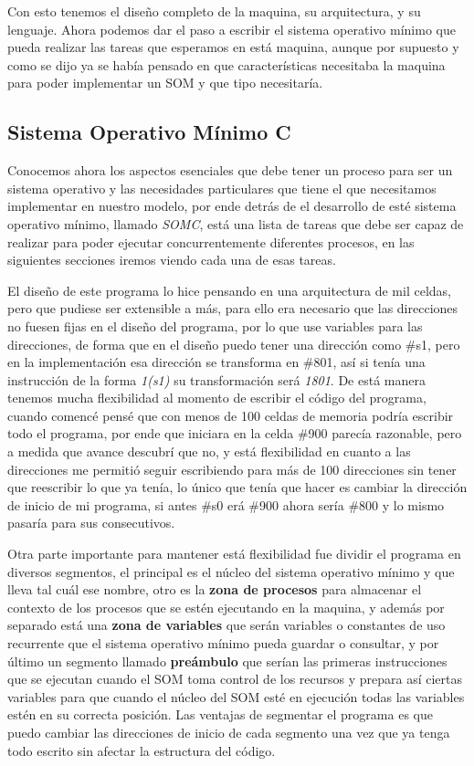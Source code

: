 \documentclass[letterpaper,12pt,oneside]{book}
\begin{document}
		Con esto tenemos el diseño completo de la maquina, su arquitectura, y su lenguaje. Ahora podemos dar el paso a escribir el sistema operativo mínimo que
		pueda realizar las tareas que esperamos en está maquina, aunque por supuesto y como se dijo ya se había pensado en que características necesitaba la maquina
		para poder implementar un SOM y que tipo necesitaría.

		
		\subsection{Sistema Operativo Mínimo C}
		
		Conocemos ahora los aspectos esenciales que debe tener un proceso para ser un sistema operativo y las necesidades particulares que tiene
		el que necesitamos implementar en nuestro modelo, por ende detrás de el desarrollo de esté sistema operativo
		mínimo, llamado \textit{SOMC}, está una lista de tareas que debe ser capaz de realizar para poder ejecutar concurrentemente diferentes procesos,
		en las siguientes secciones iremos viendo cada una de esas tareas.
		
		El diseño de este programa lo hice pensando en una arquitectura de mil celdas, pero que pudiese ser extensible a más, para ello era necesario
		que las direcciones no fuesen fijas en el diseño del programa, por lo que use variables para las direcciones, de forma que en
		el diseño puedo tener una dirección como \#s1, pero en la implementación esa dirección se transforma en \#801, así si tenía una
		instrucción de la forma \textit{1(s1)} su transformación será \textit{1801}. De está manera tenemos mucha flexibilidad al momento de escribir
		el código del programa, cuando comencé pensé que con menos de 100 celdas de memoria podría escribir todo el programa, por ende que iniciara
		en la celda \#900 parecía razonable, pero a medida que avance
		descubrí que no, y está flexibilidad en cuanto a las direcciones me permitió seguir escribiendo para más de 100 direcciones sin tener que reescribir
		lo que ya tenía, lo único que tenía que hacer es cambiar la dirección de inicio de mi programa, si antes \#s0 erá \#900 ahora sería \#800 y lo mismo
		pasaría para sus consecutivos.
		
		Otra parte importante para mantener está flexibilidad fue dividir el programa en diversos segmentos, el principal es el núcleo del
		sistema operativo mínimo y que lleva tal cuál ese nombre, otro es la \textbf{zona de procesos} para almacenar el contexto de los
		procesos que se estén ejecutando en la maquina, y además por separado está una \textbf{zona de variables} que serán variables o constantes de uso recurrente
		que el sistema operativo mínimo pueda guardar o consultar, y por último un segmento llamado \textbf{preámbulo} que serían las primeras instrucciones
		que se ejecutan cuando el SOM toma control de los recursos y prepara así ciertas variables para que cuando el núcleo del SOM esté en ejecución
		todas las variables estén en su correcta posición. Las ventajas de segmentar el programa es que puedo cambiar las direcciones de inicio de cada segmento
		una vez que ya tenga todo escrito sin afectar la estructura del código.
\end{document}

